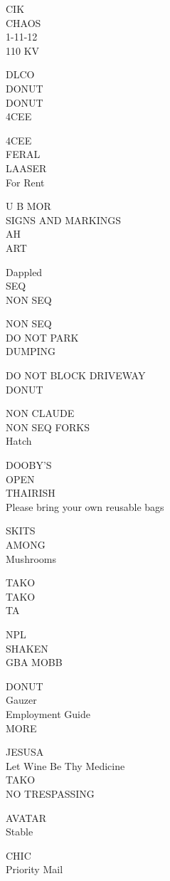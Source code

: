 \documentclass[10pt,letterpaper]{article}
\begin{document}
CIK\\
CHAOS\\
1{-}11{-}12\\
110 KV

DLCO\\
DONUT\\
DONUT\\
4CEE

4CEE\\
FERAL\\
LAASER\\
For Rent

U B MOR\\
SIGNS AND MARKINGS\\
AH\\
ART

Dappled\\
SEQ\\
NON SEQ

NON SEQ\\
DO NOT PARK\\
DUMPING

DO NOT BLOCK DRIVEWAY\\
DONUT

NON CLAUDE\\
NON SEQ FORKS\\
Hatch

DOOBY'S\\
OPEN\\
THAIRISH\\
Please bring your own reusable bags

SKITS\\
AMONG\\
Mushrooms

TAKO\\
TAKO\\
TA

NPL\\
SHAKEN\\
GBA MOBB

DONUT\\
Gauzer\\
Employment Guide\\
MORE

JESUSA\\
Let Wine Be Thy Medicine\\
TAKO\\
NO TRESPASSING

AVATAR\\
Stable

CHIC\\
Priority Mail
\end{document}
